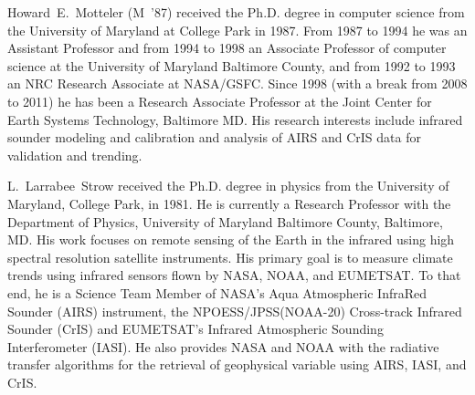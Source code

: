 \documentclass[journal]{IEEEtran}
\begin{document}

\begin{IEEEbiography}{Howard~E.~Motteler}
  (M~'87) received the Ph.D. degree in computer science from the
  University of Maryland at College Park in 1987.  From 1987 to 1994
  he was an Assistant Professor and from 1994 to 1998 an Associate
  Professor of computer science at the University of Maryland
  Baltimore County, and from 1992 to 1993 an NRC Research Associate
  at NASA/GSFC.  Since 1998 (with a break from 2008 to 2011) he has
  been a Research Associate Professor at the Joint Center for Earth
  Systems Technology, Baltimore MD.  His research interests include
  infrared sounder modeling and calibration and analysis of AIRS and
  CrIS data for validation and trending.

\end{IEEEbiography}


\begin{IEEEbiography}{L.~Larrabee~Strow}
  received the Ph.D. degree in physics from the University of
  Maryland, College Park, in 1981. He is currently a Research
  Professor with the Department of Physics, University of Maryland
  Baltimore County, Baltimore, MD. His work focuses on remote
  sensing of the Earth in the infrared using high spectral
  resolution satellite instruments. His primary goal is to measure
  climate trends using infrared sensors flown by NASA, NOAA, and
  EUMETSAT. To that end, he is a Science Team Member of NASA’s Aqua
  Atmospheric InfraRed Sounder (AIRS) instrument, the
  NPOESS/JPSS(NOAA-20) Cross-track Infrared Sounder (CrIS) and
  EUMETSAT's Infrared Atmospheric Sounding Interferometer (IASI).
  He also provides NASA and NOAA with the radiative transfer
  algorithms for the retrieval of geophysical variable using AIRS,
  IASI, and CrIS.
\end{IEEEbiography}
\end{document}
